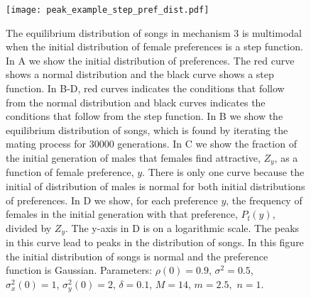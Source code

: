 \documentclass[12pt]{article}
\newcommand{\x}[1]{\text{#1}}
\begin{document}
\begin{figure}
\texttt{[image: peak\_example\_step\_pref\_dist.pdf]}
\caption{\label{peak_example_pref}  The equilibrium distribution of songs in mechanism 3 is multimodal when the initial distribution of female preferences is a step function. In A we show the initial distribution of preferences. The red curve shows a normal distribution and the black curve shows a step function. In B-D, red curves indicates the conditions that follow from the normal distribution and black curves indicates the conditions that follow from the step function. In B we show the equilibrium distribution of songs, which is found by iterating the mating process for $30000$ generations. In C we show the fraction of the initial generation of males that females find attractive, $Z_y$, as a function of female preference, $y$. There is only one curve because the initial of distribution of males is normal for both initial distributions of preferences. In D we show, for each preference $y$, the frequency of females in the initial generation with that preference, $P_\x{f}(y)$, divided by $Z_y$. The y-axis in D is on a logarithmic scale. The peaks in this curve lead to peaks in the distribution of songs. In this figure the initial distribution of songs is normal and the preference function is Gaussian. Parameters: $\rho(0)=0.9$, $\sigma^2=0.5$, $\sigma_x^2(0)=1$, $\sigma_y^2(0)=2$, $\delta=0.1$, $M=14$, $m=2.5,$ $n=1$. 
}
\end{figure}
\end{document}
